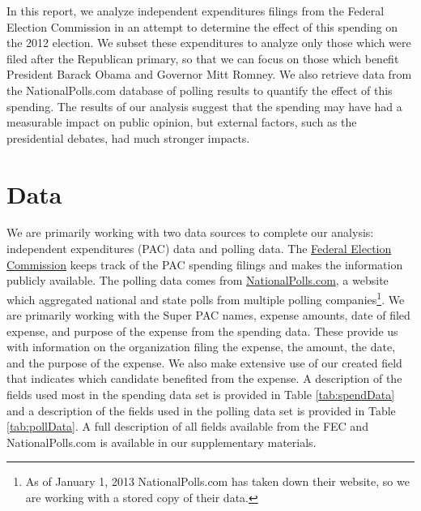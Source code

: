\documentclass[11pt]{article}\usepackage{graphicx, color}
\begin{document}
In this report, we analyze independent expenditures filings from the Federal Election Commission in an attempt to determine the effect of this spending on the 2012 election. We subset these expenditures to analyze only those which were filed after the Republican primary, so that we can focus on those which benefit President Barack Obama and Governor Mitt Romney. We also retrieve data from the NationalPolls.com database of polling results to quantify the effect of this spending. The results of our analysis suggest that the spending may have had a measurable impact on public opinion, but external factors, such as the presidential debates, had much stronger impacts.






\section{Data}
We are primarily working with two data sources to complete our analysis: independent expenditures (PAC) data and polling data. The \href{http://www.fec.gov/data/IndependentExpenditure.do?format=html&cf=superPAC}{Federal Election Commission} keeps track of the PAC spending filings and makes the information publicly available. The polling data comes from \href{http://nationalpolls.com/}{NationalPolls.com}, a website which aggregated national and state polls from multiple polling companies\footnote{As of January 1, 2013 NationalPolls.com has taken down their website, so we are working with a stored copy of their data.}.  We are primarily working with the Super PAC names, expense amounts, date of filed expense, and purpose of the expense from the spending data. These provide us with information on the organization filing the expense, the amount, the date, and the purpose of the expense. We also make extensive use of our created field that indicates which candidate benefited from the expense. A description of the fields used most in the spending data set is provided in Table \ref{tab:spendData} and a description of the fields used in the polling data set is provided in Table \ref{tab:pollData}. A full description of all fields available from the FEC and NationalPolls.com is available in our supplementary materials.
\end{document}
